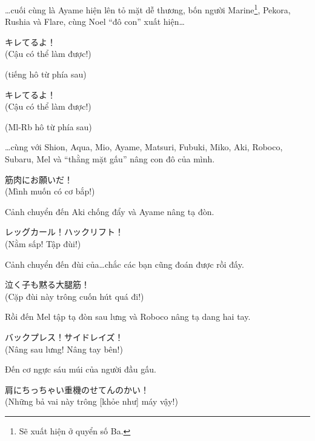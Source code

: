 \documentclass[../main.tex]{subfiles}
\begin{document}
\dots cuối cùng là Ayame hiện lên tỏ mặt dễ thương, bốn người Marine\footnote{Sẽ xuất hiện ở quyển số Ba.}, Pekora, Rushia và Flare, cùng Noel ``đô con'' xuất hiện\dots

\begin{dialogue}
   キレてるよ！\\(Cậu có thể làm được!)
\end{dialogue}

(tiếng hô từ phía sau)

\begin{dialogue}
   キレてるよ！\\(Cậu có thể làm được!)
\end{dialogue}
(Ml-Rb hô từ phía sau)

\dots cùng với Shion, Aqua, Mio, Ayame, Matsuri, Fubuki, Miko, Aki, Roboco, Subaru, Mel và ``thằng mặt gấu'' nâng con đô của mình.

\begin{dialogue}
   筋肉にお願いだ！\\(Mình muốn có cơ bắp!)
\end{dialogue}

Cảnh chuyển đến Aki chống đẩy và Ayame nâng tạ đòn.

\begin{dialogue}
   レッグカール！ハックリフト！\\(Nằm sấp! Tập đùi!)
\end{dialogue}

Cảnh chuyển đến đùi của\dots  chắc các bạn cũng đoán được rồi đấy.

\begin{dialogue}
   泣く子も黙る大腿筋！\\(Cặp đùi này trông cuốn hút quá đi!)
\end{dialogue}

Rồi đến Mel tập tạ đòn sau lưng và Roboco nâng tạ dang hai tay.

\begin{dialogue}
   バックプレス！サイドレイズ！\\(Nâng sau lưng! Nâng tay bên!)
\end{dialogue}

Đến cơ ngực sáu múi của người đầu gấu.

\begin{dialogue}
   肩にちっちゃい重機のせてんのかい！\\(Những bả vai này trông [khỏe như] máy vậy!)
\end{dialogue}
\end{document}
